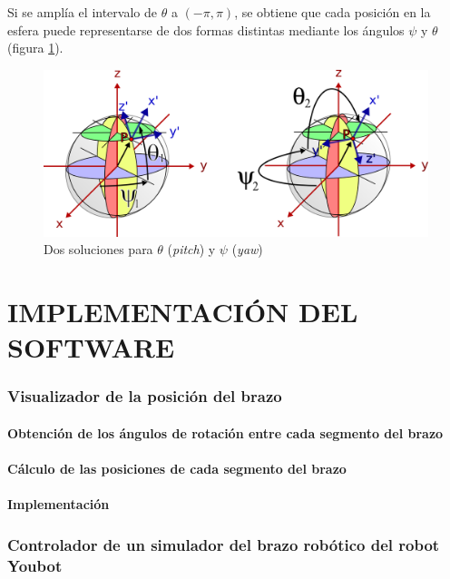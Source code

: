 \documentclass[10pt, a4paper]{report}
\begin{document}
Si se amplía el intervalo de $\theta$ a $(-\pi, \pi)$, se obtiene que cada posición en la esfera puede representarse de dos formas distintas mediante los ángulos $\psi$ y $\theta$ (figura \ref{fig: dos_soluciones_esfera}).

\begin{figure}[h]
	\centering
		\includegraphics[scale=0.85]{../img/ea_solutions.png} 
	\caption{Dos soluciones para $\theta$ (\textit{pitch}) y $\psi$ (\textit{yaw})} 
	\label{fig: dos_soluciones_esfera}
\end{figure}

\chapter{IMPLEMENTACIÓN DEL SOFTWARE}

\subsection{Visualizador de la posición del brazo}

\subsubsection{Obtención de los ángulos de rotación entre cada segmento del brazo}

\subsubsection{Cálculo de las posiciones de cada segmento del brazo}

\subsubsection{Implementación}

\subsection{Controlador de un simulador del brazo robótico del robot Youbot}
\end{document}
